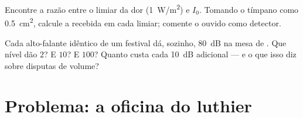 \begin{exercise}[$\star\star\star$]\label{exo:g12:sound-acoustics:14}
Encontre a razão entre o limiar da dor (\qty{1}{W/m^2}) e $I_0$. Tomando
o tímpano como \qty{0.5}{cm^2}, calcule a  recebida em cada
limiar; comente o ouvido como detector.
\end{exercise}

\begin{exercise}[$\star\star\star$]\label{exo:g12:sound-acoustics:15}
Cada alto-falante idêntico de um festival dá, sozinho, \qty{80}{dB} na
mesa de . Que nível dão $2$? E $10$? E $100$? Quanto custa cada
\qty{+10}{dB} adicional --- e o que isso diz sobre disputas de volume?
\end{exercise}

\section{Problema: a oficina do luthier}

